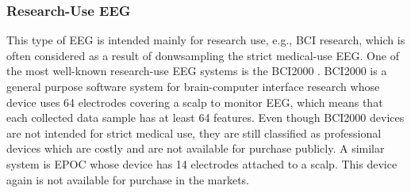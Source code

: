 \subsubsection{Research-Use EEG}
This type of EEG is intended mainly for research use, e.g., BCI research, which is often considered as a result of donwsampling the strict medical-use EEG. One of the most well-known research-use EEG systems is the BCI2000 \cite{schalk2004bci2000}. BCI2000 is a general purpose software system for brain-computer interface research whose device uses 64 electrodes covering a scalp to monitor EEG, which means that each collected data sample has at least 64 features. %
Even though BCI2000 devices are not intended for strict medical use, they are still classified as professional devices which are costly and are not available for purchase publicly. A similar system is EPOC \cite{stytsenko2011evaluation} whose device has 14 electrodes attached to a scalp. This device again is not available for purchase in the markets. %

